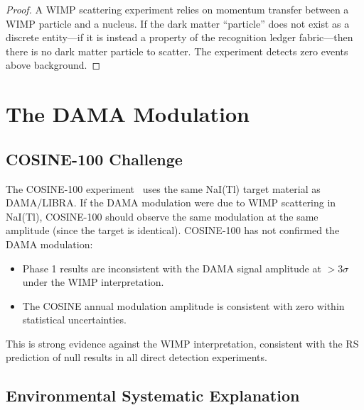 \documentclass[12pt,a4paper]{article}
\theoremstyle{definition}
\theoremstyle{remark}
\begin{document}
\begin{proof}
A WIMP scattering experiment relies on momentum transfer between a
WIMP particle and a nucleus.  If the dark matter ``particle'' does not
exist as a discrete entity---if it is instead a property of the
recognition ledger fabric---then there is no dark matter particle to
scatter.  The experiment detects zero events above background.
\end{proof}

\section{The DAMA Modulation}
\label{sec:dama}

\subsection{COSINE-100 Challenge}

The COSINE-100 experiment~\cite{COSINE2021} uses the same NaI(Tl)
target material as DAMA/LIBRA.  If the DAMA modulation were due to
WIMP scattering in NaI(Tl), COSINE-100 should observe the same
modulation at the same amplitude (since the target is identical).
COSINE-100 has not confirmed the DAMA modulation:
\begin{itemize}
  \item Phase 1 results are inconsistent with the DAMA signal amplitude
  at $>3\sigma$ under the WIMP interpretation.
  \item The COSINE annual modulation amplitude is consistent with zero
  within statistical uncertainties.
\end{itemize}

This is strong evidence against the WIMP interpretation, consistent
with the RS prediction of null results in all direct detection
experiments.

\subsection{Environmental Systematic Explanation}
\end{document}
